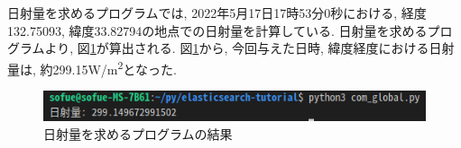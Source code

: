 











日射量を求めるプログラムでは, 2022年5月17日17時53分0秒における, 経度132.75093, 緯度33.82794の地点での日射量を計算している.
日射量を求めるプログラムより, 図\ref{20220523-p1}が算出される.
図\ref{20220523-p1}から, 今回与えた日時, 緯度経度における日射量は, 約299.15\si{\watt}/\si{\metre\squared}となった.

\begin{figure}
  \begin{center}
    \includegraphics[width=160mm]{sotu/figure/2/output.png}
    \caption{日射量を求めるプログラムの結果}
    \label{20220523-p1}
  \end{center}
\end{figure}


